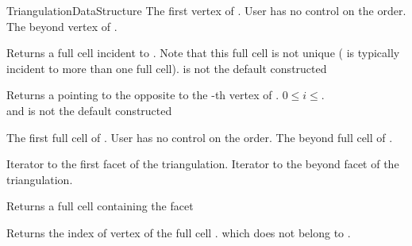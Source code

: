 \begin{ccRefConcept}{TriangulationDataStructure}
{
The first vertex of \ccVar. User has no control on the order.
}
\ccGlue
{}
{
The beyond vertex of \ccVar.
}


{Returns a full cell incident to  . Note that this
  full cell is
not unique ( is typically incident to more than one full cell).
\ccPrecond{} is not the default constructed }

{ Returns a  pointing to the 
opposite to the -th vertex of . 
\ccPrecond$0\leq i \leq$\ccVar.\\
and  is not the default constructed }

{
The first full cell of \ccVar.  User has no control on the order.
}
\ccGlue
{}
{
The beyond full cell of \ccVar.
}


{Iterator to the first facet of the triangulation.}
\ccGlue
{}
{Iterator to the beyond facet of the triangulation.}

{Returns a full cell containing the facet }

{Returns the index of vertex of the full cell \ccVar.
which does {not} belong to .}

%
%



\end{ccRefConcept}
